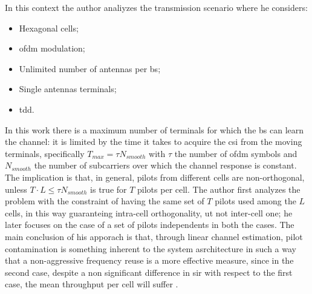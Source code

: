 \documentclass[11pt]{book}
\begin{document}
In this context the author analiyzes the transmission scenario where he considers:
\begin{itemize}
  \item Hexagonal cells;
  \item \gls{ofdm} modulation;
  \item Unlimited number of antennas per \gls{bs};
  \item Single antennas terminals;
  \item \gls{tdd}.
\end{itemize}
In this work there is a maximum number of terminals for which the \gls{bs} can learn the channel: it is limited by the time it takes to acquire the \gls{csi} from the moving terminals, specifically $T_{max} = \tau N_{smooth}$ with $\tau$ the number of \gls{ofdm} symbols and $N_{smooth}$ the number of subcarriers over which the channel response is constant. The implication is that, in general, pilots from different cells are non-orthogonal, unless $T\cdot L \leq \tau N_{smooth}$ is true for $T$ pilots per cell. The author first analyzes the problem with the constraint of having the same set of $T$ pilots used among the $L$ cells, in this way guaranteing intra-cell orthogonality, ut not inter-cell one; he later focuses on the case of a set of pilots independents in both the cases. The main conclusion of his apporach is that, through linear channel estimation, pilot contamination is something inherent to the system asrchitecture in such a way that a non-aggressive frequency reuse is a more effective measure, since in the second case, despite a non significant difference in \gls{sir} with respect to the first case, the mean throughput per cell will suffer \cite{Marzetta2010}.
\end{document}
